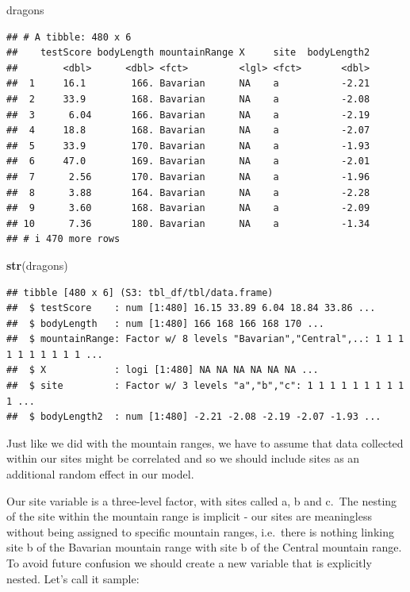 \documentclass[
]{article}
\newenvironment{Shaded}{\begin{snugshade}}{\end{snugshade}}
\newcommand{\FunctionTok}[1]{\textcolor[rgb]{0.13,0.29,0.53}{\textbf{#1}}}
\newcommand{\NormalTok}[1]{#1}
\begin{document}
\begin{Shaded}
\begin{Highlighting}[]
\NormalTok{dragons}
\end{Highlighting}
\end{Shaded}

\begin{verbatim}
## # A tibble: 480 x 6
##    testScore bodyLength mountainRange X     site  bodyLength2
##        <dbl>      <dbl> <fct>         <lgl> <fct>       <dbl>
##  1     16.1        166. Bavarian      NA    a           -2.21
##  2     33.9        168. Bavarian      NA    a           -2.08
##  3      6.04       166. Bavarian      NA    a           -2.19
##  4     18.8        168. Bavarian      NA    a           -2.07
##  5     33.9        170. Bavarian      NA    a           -1.93
##  6     47.0        169. Bavarian      NA    a           -2.01
##  7      2.56       170. Bavarian      NA    a           -1.96
##  8      3.88       164. Bavarian      NA    a           -2.28
##  9      3.60       168. Bavarian      NA    a           -2.09
## 10      7.36       180. Bavarian      NA    a           -1.34
## # i 470 more rows
\end{verbatim}

\begin{Shaded}
\begin{Highlighting}[]
\FunctionTok{str}\NormalTok{(dragons)}
\end{Highlighting}
\end{Shaded}

\begin{verbatim}
## tibble [480 x 6] (S3: tbl_df/tbl/data.frame)
##  $ testScore    : num [1:480] 16.15 33.89 6.04 18.84 33.86 ...
##  $ bodyLength   : num [1:480] 166 168 166 168 170 ...
##  $ mountainRange: Factor w/ 8 levels "Bavarian","Central",..: 1 1 1 1 1 1 1 1 1 1 ...
##  $ X            : logi [1:480] NA NA NA NA NA NA ...
##  $ site         : Factor w/ 3 levels "a","b","c": 1 1 1 1 1 1 1 1 1 1 ...
##  $ bodyLength2  : num [1:480] -2.21 -2.08 -2.19 -2.07 -1.93 ...
\end{verbatim}

Just like we did with the mountain ranges, we have to assume that data
collected within our sites might be correlated and so we should include
sites as an additional random effect in our model.

Our site variable is a three-level factor, with sites called a, b and
c.~The nesting of the site within the mountain range is implicit - our
sites are meaningless without being assigned to specific mountain
ranges, i.e.~there is nothing linking site b of the Bavarian mountain
range with site b of the Central mountain range. To avoid future
confusion we should create a new variable that is explicitly nested.
Let's call it sample:
\end{document}
